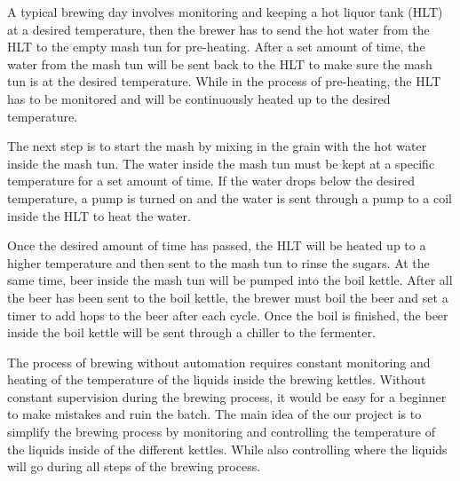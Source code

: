 
A typical brewing day involves monitoring and keeping a hot liquor tank (HLT) at a desired temperature, then the
brewer has to send the hot water from the HLT to the empty mash tun for pre-heating. After a set amount of time, the water from the mash tun
will be sent back to the HLT to make sure the mash tun is at the desired temperature. While in the process of
pre-heating, the HLT has to be monitored and will be continuously heated up to the desired temperature.

The next step is to start the mash by mixing in the grain with the hot water inside the mash tun. The water inside the mash tun must be kept at a specific temperature for a set amount of time. If the water drops below the desired temperature, a pump is turned on and the water
is sent through a pump to a coil inside the HLT to heat the water.

Once the desired amount of time has passed, the HLT will
be heated up to a higher temperature and then sent to the mash tun to rinse the sugars.
At the same time, beer inside the mash tun will be pumped into the boil kettle.
After all the beer has been sent to the boil kettle, the brewer must boil the beer and set a timer to add hops to the beer
after each cycle. Once the boil is finished, the beer inside the boil kettle will be sent through a chiller to the fermenter.

The process of brewing without automation requires constant monitoring and heating of the temperature of the liquids inside the brewing kettles. Without constant supervision during the brewing process, it would be easy for a beginner to make mistakes and ruin the batch. The main idea of the our project is to simplify the brewing process by monitoring and controlling the temperature of the liquids inside of the different kettles. While also controlling where the liquids will go during all steps of the brewing process.
